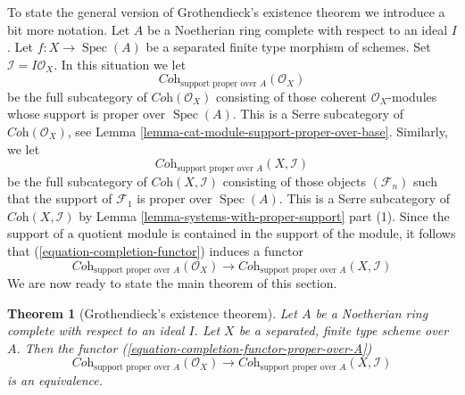 \documentclass{stacks-project}
\newenvironment{reference}{\comment}{\endcomment}
\theoremstyle{plain}
\newtheorem{theorem}[subsection]{Theorem}
\theoremstyle{definition}
\theoremstyle{remark}
\numberwithin{equation}{subsection}
\def\Spec{\mathop{\mathrm{Spec}}}
\begin{document}
\noindent
To state the general version of Grothendieck's existence theorem
we introduce a bit more notation. Let $A$ be a Noetherian ring
complete with respect to an ideal $I$. Let $f : X \to \Spec(A)$
be a separated finite type morphism of schemes. Set
$\mathcal{I} = I\mathcal{O}_X$. In this situation we let
$$
\textit{Coh}_{\text{support proper over } A}(\mathcal{O}_X)
$$
be the full subcategory of $\textit{Coh}(\mathcal{O}_X)$
consisting of those coherent $\mathcal{O}_X$-modules whose
support is proper over $\Spec(A)$. This is a Serre subcategory of
$\textit{Coh}(\mathcal{O}_X)$, see
Lemma \ref{lemma-cat-module-support-proper-over-base}.
Similarly, we let
$$
\textit{Coh}_{\text{support proper over } A}(X, \mathcal{I})
$$
be the full subcategory of $\textit{Coh}(X, \mathcal{I})$
consisting of those objects $(\mathcal{F}_n)$ such that
the support of $\mathcal{F}_1$ is proper over $\Spec(A)$.
This is a Serre subcategory of $\textit{Coh}(X, \mathcal{I})$
by Lemma \ref{lemma-systems-with-proper-support} part (1).
Since the support of a quotient module is contained in the support
of the module, it follows that (\ref{equation-completion-functor})
induces a functor
\begin{equation}
\label{equation-completion-functor-proper-over-A}
\textit{Coh}_{\text{support proper over }A}(\mathcal{O}_X)
\longrightarrow
\textit{Coh}_{\text{support proper over }A}(X, \mathcal{I})
\end{equation}
We are now ready to state the main theorem of this section.

\begin{theorem}[Grothendieck's existence theorem]
\label{theorem-grothendieck-existence}
\begin{reference}
\cite[III Theorem 5.1.5]{EGA}
\end{reference}
Let $A$ be a Noetherian ring complete with respect to an ideal $I$.
Let $X$ be a separated, finite type scheme over $A$. Then
the functor
(\ref{equation-completion-functor-proper-over-A})
$$
\textit{Coh}_{\text{support proper over }A}(\mathcal{O}_X)
\longrightarrow
\textit{Coh}_{\text{support proper over }A}(X, \mathcal{I})
$$
is an equivalence.
\end{theorem}
\end{document}

